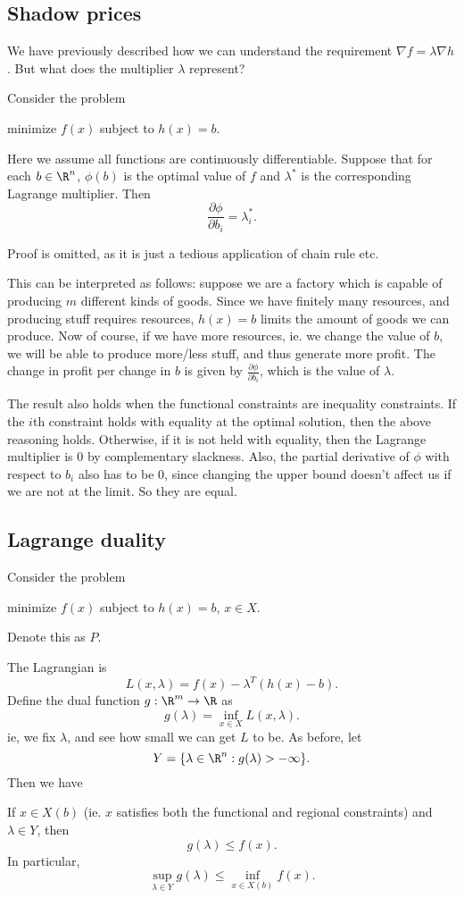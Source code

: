\documentclass[a4paper]{article}
\begin{document}
\subsection{Shadow prices}
We have previously described how we can understand the requirement $\nabla f = \lambda \nabla h$. But what does the multiplier $\lambda$ represent?
\begin{thm}
  Consider the problem
  \begin{center}
    minimize $f(x)$ subject to $h(x) = b$.
  \end{center}
  Here we assume all functions are continuously differentiable. Suppose that for each $b\in \R^n$, $\phi(b)$ is the optimal value of $f$ and $\lambda^*$ is the corresponding Lagrange multiplier. Then
  \[
    \frac{\partial \phi}{\partial b_i} = \lambda_i^*.
  \]
\end{thm}
Proof is omitted, as it is just a tedious application of chain rule etc.

This can be interpreted as follows: suppose we are a factory which is capable of producing $m$ different kinds of goods. Since we have finitely many resources, and producing stuff requires resources, $h(x) = b$ limits the amount of goods we can produce. Now of course, if we have more resources, ie. we change the value of $b$, we will be able to produce more/less stuff, and thus generate more profit. The change in profit per change in $b$ is given by $\frac{\partial \phi}{\partial b_i}$, which is the value of $\lambda$.

The result also holds when the functional constraints are inequality constraints. If the $i$th constraint holds with equality at the optimal solution, then the above reasoning holds. Otherwise, if it is not held with equality, then the Lagrange multiplier is $0$ by complementary slackness. Also, the partial derivative of $\phi$ with respect to $b_i$ also has to be $0$, since changing the upper bound doesn't affect us if we are not at the limit. So they are equal.
\subsection{Lagrange duality}
Consider the problem
\begin{center}
  minimize $f(x)$ subject to $h(x) = b$, $x\in X$.
\end{center}
Denote this as $P$.

The Lagrangian is
\[
  L(x, \lambda) = f(x) - \lambda^T (h(x) - b).
\]
Define the dual function $g: \R^m \to \R$ as
\[
  g(\lambda) = \inf_{x\in X}L(x, \lambda).
\]
ie, we fix $\lambda$, and see how small we can get $L$ to be. As before, let
\[
  Y = \{\lambda\in \R^n: g(\lambda) > -\infty\}.
\]
Then we have
\begin{thm}
  If $x\in X(b)$ (ie. $x$ satisfies both the functional and regional constraints) and $\lambda \in Y$, then
  \[
    g(\lambda) \leq f(x).
  \]
  In particular,
  \[
    \sup_{\lambda\in Y}g(\lambda) \leq \inf_{x\in X(b)}f(x).
  \]
\end{thm}
\end{document}
